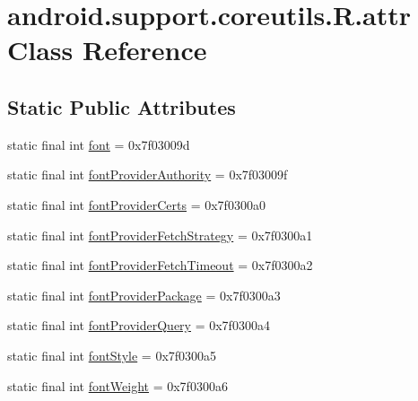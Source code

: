 \hypertarget{classandroid_1_1support_1_1coreutils_1_1R_1_1attr}{}\section{android.\+support.\+coreutils.\+R.\+attr Class Reference}
\label{classandroid_1_1support_1_1coreutils_1_1R_1_1attr}
\subsection*{Static Public Attributes}
\begin{DoxyCompactItemize}
\item 
static final int \mbox{\hyperlink{classandroid_1_1support_1_1coreutils_1_1R_1_1attr_a4c489a82e7e8fd81bb99423b6b0f8770}{font}} = 0x7f03009d
\item 
static final int \mbox{\hyperlink{classandroid_1_1support_1_1coreutils_1_1R_1_1attr_a145db22aa419474281d301892c204dab}{font\+Provider\+Authority}} = 0x7f03009f
\item 
static final int \mbox{\hyperlink{classandroid_1_1support_1_1coreutils_1_1R_1_1attr_a08e7fefed18115b7cf844cb2e454d2e0}{font\+Provider\+Certs}} = 0x7f0300a0
\item 
static final int \mbox{\hyperlink{classandroid_1_1support_1_1coreutils_1_1R_1_1attr_af344c37d405b3d7b00fb99753445a715}{font\+Provider\+Fetch\+Strategy}} = 0x7f0300a1
\item 
static final int \mbox{\hyperlink{classandroid_1_1support_1_1coreutils_1_1R_1_1attr_a17b974df2f12a142fdc7448b71f2efbc}{font\+Provider\+Fetch\+Timeout}} = 0x7f0300a2
\item 
static final int \mbox{\hyperlink{classandroid_1_1support_1_1coreutils_1_1R_1_1attr_a2a233565e2dd7dd918cd046a6655fe18}{font\+Provider\+Package}} = 0x7f0300a3
\item 
static final int \mbox{\hyperlink{classandroid_1_1support_1_1coreutils_1_1R_1_1attr_a79e49416ddb757a842e56544cb28a6d7}{font\+Provider\+Query}} = 0x7f0300a4
\item 
static final int \mbox{\hyperlink{classandroid_1_1support_1_1coreutils_1_1R_1_1attr_a9b35d3307670f8ef6f267a5b6d5bfc29}{font\+Style}} = 0x7f0300a5
\item 
static final int \mbox{\hyperlink{classandroid_1_1support_1_1coreutils_1_1R_1_1attr_a7c873eec8f29f4228759f62bbcd2969d}{font\+Weight}} = 0x7f0300a6
\end{DoxyCompactItemize}


